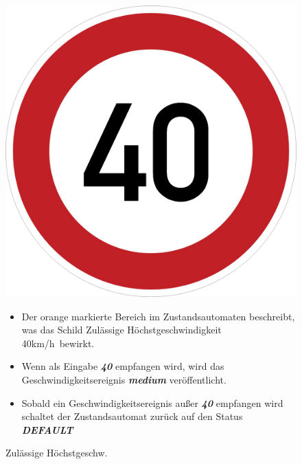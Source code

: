 \begin{figure}[h]
	\begin{minipage}[t]{4cm}
		\vspace{0pt}
		\centering
		\includegraphics[scale=0.07]{images/40.png}
		\caption{Zul\"assige H\"ochstgeschw.}
		\label{fig:PED}
	\end{minipage}
	\hfill
	\begin{minipage}[t]{10cm}
		\vspace{0pt}
		\begin{itemize}
			\item Der orange markierte Bereich im Zustandsautomaten beschreibt, was das Schild \glqq Zul\"assige H\"ochstgeschwindigkeit 40km/h\grqq\ bewirkt.
			
			\item Wenn als Eingabe \textbf{\textit{40}} empfangen wird, wird das Geschwindigkeitsereignis \textbf{\textit{medium}} ver\"offentlicht.
			
			\item Sobald ein Geschwindigkeitsereignis au\ss{}er \textbf{\textit{40}} empfangen wird schaltet der Zustandsautomat zur\"uck auf den Status \textbf{\textit{DEFAULT}}
		\end{itemize}
	\end{minipage}
\end{figure}


